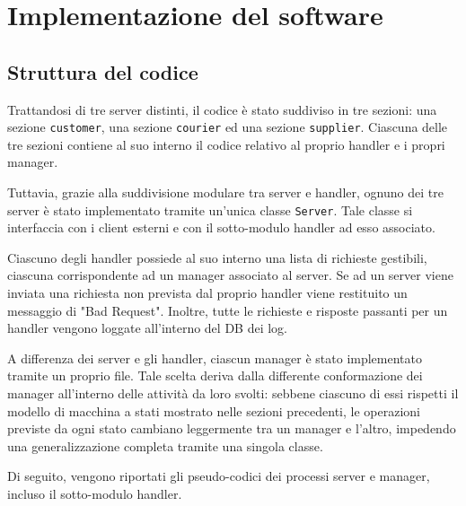 \documentclass[12pt]{report}
\begin{document}
    \chapter{Implementazione del software}
    
    \section{Struttura del codice}

    Trattandosi di tre server distinti, il codice è stato suddiviso in tre sezioni: una sezione \texttt{customer}, una sezione \texttt{courier} ed una sezione \texttt{supplier}. Ciascuna delle tre sezioni contiene al suo interno il codice relativo al proprio handler e i propri manager.

    Tuttavia, grazie alla suddivisione modulare tra server e handler, ognuno dei tre server è stato implementato tramite un'unica classe \texttt{Server}. Tale classe si interfaccia con i client esterni e con il sotto-modulo handler ad esso associato.
    
    Ciascuno degli handler possiede al suo interno una lista di richieste gestibili, ciascuna corrispondente ad un manager associato al server. Se ad un server viene inviata una richiesta non prevista dal proprio handler viene restituito un messaggio di "Bad Request". Inoltre, tutte le richieste e risposte passanti per un handler vengono loggate all'interno del DB dei log.

    A differenza dei server e gli handler, ciascun manager è stato implementato tramite un proprio file. Tale scelta deriva dalla differente conformazione dei manager all'interno delle attività da loro svolti: sebbene ciascuno di essi rispetti il modello di macchina a stati mostrato nelle sezioni precedenti, le operazioni previste da ogni stato cambiano leggermente tra un manager e l'altro, impedendo una generalizzazione completa tramite una singola classe. 

    \newpage

    Di seguito, vengono riportati gli pseudo-codici dei processi server e manager, incluso il sotto-modulo handler.
    
\end{document}

